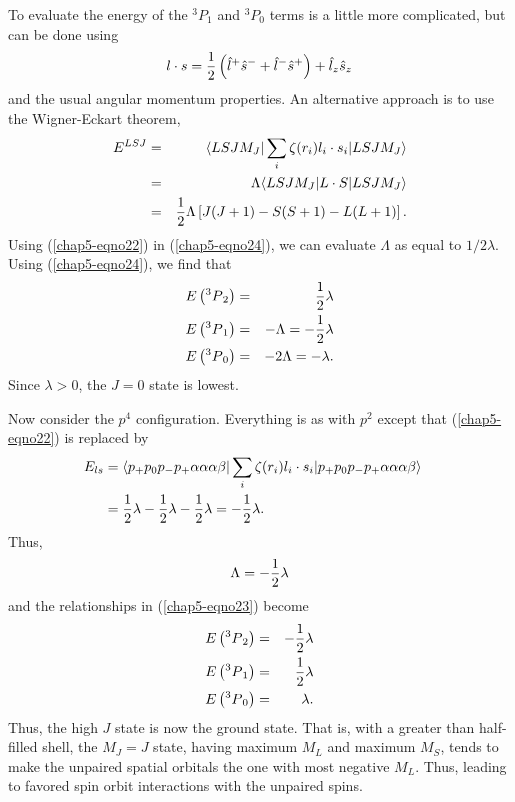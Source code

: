 To evaluate the energy of the ${^3P}_1$ and ${^3P}_0$ terms is a 
little more complicated, but can be done using
\begin{equation}
l \cdot s = {1 \over 2} \left( {\hat l}^+ {\hat s}^- + {\hat l}^- 
{\hat s}^+ \right) + {\hat l}_z {\hat s}_z
\label{chap5-eqno23}
\end{equation}
and the usual angular momentum properties.  An alternative approach 
is to use the Wigner-Eckart theorem,
\begin{eqnarray}
E^{LSJ} &=& \langle LSJM_J | \sum_{i} \zeta ( r_i ) l_i \cdot s_i | 
LSJM_J \rangle\cr
&=& \Lambda \langle LSJM_J | L \cdot S | LSJM_J \rangle\cr
&=& {1 \over 2} \Lambda \left[ J ( J + 1 ) - S ( S + 1) - 
L(L+1)\right].
\label{chap5-eqno24}
\end{eqnarray}
Using (\ref{chap5-eqno22}) in (\ref{chap5-eqno24}), we can evaluate
$\Lambda$ as equal to  
$1/2\lambda$.  Using (\ref{chap5-eqno24}), we find that
\begin{eqnarray}
E \left( {^3P}_2 \right) &=& {1 \over 2} \lambda\cr
E \left( {^3P}_1 \right) &=& - \Lambda = - {1 \over 2} \lambda\cr
E \left( {^3P}_0 \right) &=& - 2 \Lambda = - \lambda .
\end{eqnarray}
Since $\lambda > 0$, the $J = 0$ state is lowest.

Now consider the $p^4$ configuration.  Everything is as with $p^2$ 
except that (\ref{chap5-eqno22}) is replaced by
\begin{eqnarray}
E_{ls} &= \langle p_+ p_0 p_- p_+ \alpha \alpha \alpha \beta | 
\sum_{i} \zeta ( r_i ) l_i \cdot s_i | p_+ p_0 p_- p_+ \alpha \alpha 
\alpha \beta \rangle\cr
&= {1 \over 2} \lambda - {1 \over 2} \lambda - {1 \over 2} 
\lambda = - {1 \over 2} \lambda .\cr
\end{eqnarray}
Thus,
\begin{equation}
\Lambda = -{1 \over 2} \lambda
\end{equation}
and the relationships in (\ref{chap5-eqno23}) become
\begin{eqnarray}
E \left( {^3P}_2 \right) &=& - {1 \over 2} \lambda\cr
E \left( {^3P}_1 \right) &=& {1 \over 2} \lambda\cr
E \left( {^3P}_0 \right) &=& \lambda.
\end{eqnarray}
Thus, the high $J$ state is now the ground state.  That is, with a 
greater than half-filled shell, the $M_J = J$ state, having maximum 
$M_L$ and maximum $M_S$, tends to make the unpaired spatial orbitals 
the one with most negative $M_L$.  Thus, leading to favored spin 
orbit interactions with the unpaired spins.

